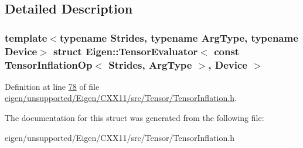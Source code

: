 \subsection{Detailed Description}
\subsubsection*{template$<$typename Strides, typename Arg\+Type, typename Device$>$\newline
struct Eigen\+::\+Tensor\+Evaluator$<$ const Tensor\+Inflation\+Op$<$ Strides, Arg\+Type $>$, Device $>$}



Definition at line \hyperlink{eigen_2unsupported_2_eigen_2_c_x_x11_2src_2_tensor_2_tensor_inflation_8h_source_l00078}{78} of file \hyperlink{eigen_2unsupported_2_eigen_2_c_x_x11_2src_2_tensor_2_tensor_inflation_8h_source}{eigen/unsupported/\+Eigen/\+C\+X\+X11/src/\+Tensor/\+Tensor\+Inflation.\+h}.



The documentation for this struct was generated from the following file\+:\begin{DoxyCompactItemize}
\item 
eigen/unsupported/\+Eigen/\+C\+X\+X11/src/\+Tensor/\+Tensor\+Inflation.\+h\end{DoxyCompactItemize}
